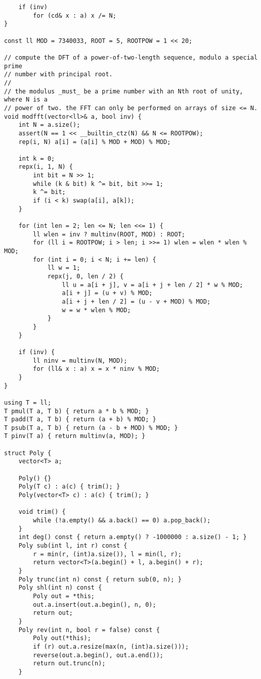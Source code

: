 \documentclass[twoside]{article}
\begin{document}
\begin{multicols*}{2}
\begin{verbatim}
    if (inv)
        for (cd& x : a) x /= N;
}

const ll MOD = 7340033, ROOT = 5, ROOTPOW = 1 << 20;

// compute the DFT of a power-of-two-length sequence, modulo a special prime
// number with principal root.
//
// the modulus _must_ be a prime number with an Nth root of unity, where N is a
// power of two. the FFT can only be performed on arrays of size <= N.
void modfft(vector<ll>& a, bool inv) {
    int N = a.size();
    assert(N == 1 << __builtin_ctz(N) && N <= ROOTPOW);
    rep(i, N) a[i] = (a[i] % MOD + MOD) % MOD;

    int k = 0;
    repx(i, 1, N) {
        int bit = N >> 1;
        while (k & bit) k ^= bit, bit >>= 1;
        k ^= bit;
        if (i < k) swap(a[i], a[k]);
    }

    for (int len = 2; len <= N; len <<= 1) {
        ll wlen = inv ? multinv(ROOT, MOD) : ROOT;
        for (ll i = ROOTPOW; i > len; i >>= 1) wlen = wlen * wlen % MOD;
        for (int i = 0; i < N; i += len) {
            ll w = 1;
            repx(j, 0, len / 2) {
                ll u = a[i + j], v = a[i + j + len / 2] * w % MOD;
                a[i + j] = (u + v) % MOD;
                a[i + j + len / 2] = (u - v + MOD) % MOD;
                w = w * wlen % MOD;
            }
        }
    }

    if (inv) {
        ll ninv = multinv(N, MOD);
        for (ll& x : a) x = x * ninv % MOD;
    }
}

using T = ll;
T pmul(T a, T b) { return a * b % MOD; }
T padd(T a, T b) { return (a + b) % MOD; }
T psub(T a, T b) { return (a - b + MOD) % MOD; }
T pinv(T a) { return multinv(a, MOD); }

struct Poly {
    vector<T> a;

    Poly() {}
    Poly(T c) : a(c) { trim(); }
    Poly(vector<T> c) : a(c) { trim(); }

    void trim() {
        while (!a.empty() && a.back() == 0) a.pop_back();
    }
    int deg() const { return a.empty() ? -1000000 : a.size() - 1; }
    Poly sub(int l, int r) const {
        r = min(r, (int)a.size()), l = min(l, r);
        return vector<T>(a.begin() + l, a.begin() + r);
    }
    Poly trunc(int n) const { return sub(0, n); }
    Poly shl(int n) const {
        Poly out = *this;
        out.a.insert(out.a.begin(), n, 0);
        return out;
    }
    Poly rev(int n, bool r = false) const {
        Poly out(*this);
        if (r) out.a.resize(max(n, (int)a.size()));
        reverse(out.a.begin(), out.a.end());
        return out.trunc(n);
    }


\end{verbatim}
\end{multicols*}
\end{document}

